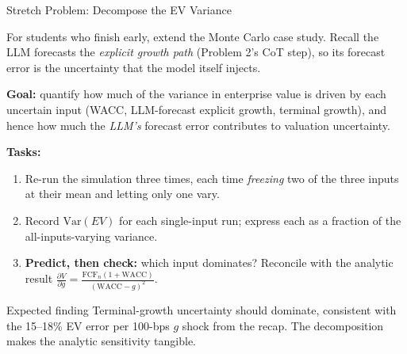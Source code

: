 \documentclass[9pt,t]{beamer}
\begin{document}
\begin{frame}[noframenumbering]{Stretch Problem: Decompose the EV Variance}

For students who finish early, extend the Monte Carlo case study. Recall the LLM
forecasts the \emph{explicit growth path} (Problem 2's CoT step), so its forecast error
is the uncertainty that the model itself injects.

\medskip
\textbf{Goal:} quantify how much of the variance in enterprise value is driven by
each uncertain input (WACC, LLM-forecast explicit growth, terminal growth), and hence
how much the \emph{LLM's} forecast error contributes to valuation uncertainty.

\medskip
\textbf{Tasks:}
\begin{enumerate}
  \item Re-run the simulation three times, each time \emph{freezing} two of the
        three inputs at their mean and letting only one vary.
  \item Record $\mathrm{Var}(EV)$ for each single-input run; express each as a
        fraction of the all-inputs-varying variance.
  \item \textbf{Predict, then check:} which input dominates? Reconcile with the
        analytic result $\frac{\partial V}{\partial g} = \frac{\text{FCF}_n(1+\text{WACC})}{(\text{WACC}-g)^2}$.
\end{enumerate}

\medskip
\begin{block}{Expected finding}
Terminal-growth uncertainty should dominate, consistent with the 15--18\% EV error
per 100-bps $g$ shock from the recap. The decomposition makes the analytic
sensitivity tangible.
\end{block}
\end{frame}
\end{document}
